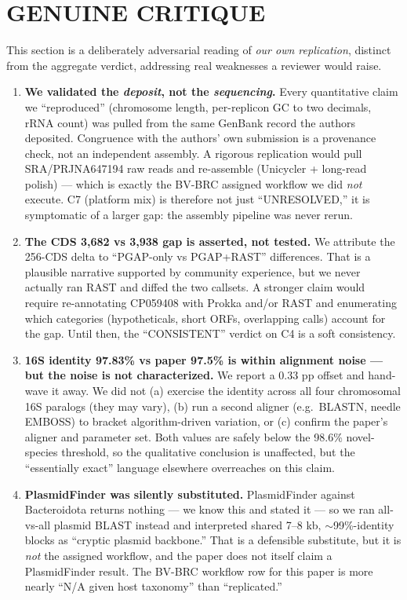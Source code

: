 \documentclass[11pt,letterpaper]{article}
\begin{document}
\section{GENUINE CRITIQUE}
This section is a deliberately adversarial reading of \emph{our own replication}, distinct from the aggregate verdict, addressing real weaknesses a reviewer would raise.

\begin{enumerate}[leftmargin=1.4em,itemsep=3pt]
  \item \textbf{We validated the \emph{deposit}, not the \emph{sequencing}.} Every quantitative claim we ``reproduced'' (chromosome length, per-replicon GC to two decimals, rRNA count) was pulled from the same GenBank record the authors deposited. Congruence with the authors' own submission is a provenance check, not an independent assembly. A rigorous replication would pull SRA/PRJNA647194 raw reads and re-assemble (Unicycler + long-read polish) --- which is exactly the BV-BRC assigned workflow we did \emph{not} execute. C7 (platform mix) is therefore not just ``UNRESOLVED,'' it is symptomatic of a larger gap: the assembly pipeline was never rerun.

  \item \textbf{The CDS 3{,}682 vs 3{,}938 gap is asserted, not tested.} We attribute the 256-CDS delta to ``PGAP-only vs PGAP+RAST'' differences. That is a plausible narrative supported by community experience, but we never actually ran RAST and diffed the two callsets. A stronger claim would require re-annotating CP059408 with Prokka and/or RAST and enumerating which categories (hypotheticals, short ORFs, overlapping calls) account for the gap. Until then, the ``CONSISTENT'' verdict on C4 is a soft consistency.

  \item \textbf{16S identity 97.83\% vs paper 97.5\% is within alignment noise --- but the noise is not characterized.} We report a 0.33 pp offset and hand-wave it away. We did not (a) exercise the identity across all four chromosomal 16S paralogs (they may vary), (b) run a second aligner (e.g.\ BLASTN, needle EMBOSS) to bracket algorithm-driven variation, or (c) confirm the paper's aligner and parameter set. Both values are safely below the 98.6\% novel-species threshold, so the qualitative conclusion is unaffected, but the ``essentially exact'' language elsewhere overreaches on this claim.

  \item \textbf{PlasmidFinder was silently substituted.} PlasmidFinder against Bacteroidota returns nothing --- we know this and stated it --- so we ran all-vs-all plasmid BLAST instead and interpreted shared 7--8 kb, $\sim$99\%-identity blocks as ``cryptic plasmid backbone.'' That is a defensible substitute, but it is \emph{not} the assigned workflow, and the paper does not itself claim a PlasmidFinder result. The BV-BRC workflow row for this paper is more nearly ``N/A given host taxonomy'' than ``replicated.''


\end{enumerate}
\end{document}
